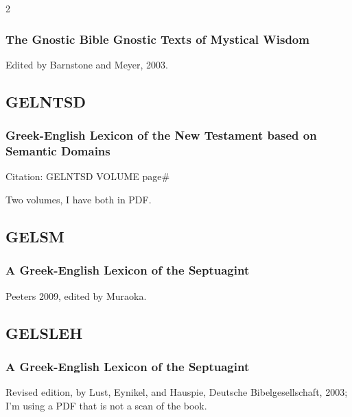 \begin{multicols}{2}
		\subsubsection*{The Gnostic Bible Gnostic Texts of Mystical Wisdom}
		
			Edited by Barnstone and Meyer, 2003.
			
	\subsection*{GELNTSD}
	
		\subsubsection*{Greek-English Lexicon of the New Testament based on Semantic Domains}
		
			Citation:
				GELNTSD VOLUME page\#
		
			Two volumes, I have both in PDF.
			
	\subsection*{GELSM}
	
		\subsubsection*{A Greek-English Lexicon of the Septuagint}
		
			Peeters 2009, edited by Muraoka.
			
	\subsection*{GELSLEH}
	
		\subsubsection*{A Greek-English Lexicon of the Septuagint}
		
			Revised edition, by Lust, Eynikel, and Hauspie, Deutsche Bibelgesellschaft, 2003; I'm using a PDF that is not a scan of the book.
			

\end{multicols}
